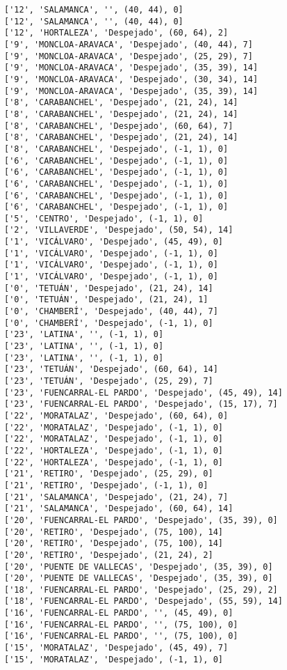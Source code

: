 \documentclass[11pt]{article}
\begin{document}
\begin{Verbatim}[commandchars=\\\{\}]
['12', 'SALAMANCA', '', (40, 44), 0]
['12', 'SALAMANCA', '', (40, 44), 0]
['12', 'HORTALEZA', 'Despejado', (60, 64), 2]
['9', 'MONCLOA-ARAVACA', 'Despejado', (40, 44), 7]
['9', 'MONCLOA-ARAVACA', 'Despejado', (25, 29), 7]
['9', 'MONCLOA-ARAVACA', 'Despejado', (35, 39), 14]
['9', 'MONCLOA-ARAVACA', 'Despejado', (30, 34), 14]
['9', 'MONCLOA-ARAVACA', 'Despejado', (35, 39), 14]
['8', 'CARABANCHEL', 'Despejado', (21, 24), 14]
['8', 'CARABANCHEL', 'Despejado', (21, 24), 14]
['8', 'CARABANCHEL', 'Despejado', (60, 64), 7]
['8', 'CARABANCHEL', 'Despejado', (21, 24), 14]
['8', 'CARABANCHEL', 'Despejado', (-1, 1), 0]
['6', 'CARABANCHEL', 'Despejado', (-1, 1), 0]
['6', 'CARABANCHEL', 'Despejado', (-1, 1), 0]
['6', 'CARABANCHEL', 'Despejado', (-1, 1), 0]
['6', 'CARABANCHEL', 'Despejado', (-1, 1), 0]
['6', 'CARABANCHEL', 'Despejado', (-1, 1), 0]
['5', 'CENTRO', 'Despejado', (-1, 1), 0]
['2', 'VILLAVERDE', 'Despejado', (50, 54), 14]
['1', 'VICÁLVARO', 'Despejado', (45, 49), 0]
['1', 'VICÁLVARO', 'Despejado', (-1, 1), 0]
['1', 'VICÁLVARO', 'Despejado', (-1, 1), 0]
['1', 'VICÁLVARO', 'Despejado', (-1, 1), 0]
['0', 'TETUÁN', 'Despejado', (21, 24), 14]
['0', 'TETUÁN', 'Despejado', (21, 24), 1]
['0', 'CHAMBERÍ', 'Despejado', (40, 44), 7]
['0', 'CHAMBERÍ', 'Despejado', (-1, 1), 0]
['23', 'LATINA', '', (-1, 1), 0]
['23', 'LATINA', '', (-1, 1), 0]
['23', 'LATINA', '', (-1, 1), 0]
['23', 'TETUÁN', 'Despejado', (60, 64), 14]
['23', 'TETUÁN', 'Despejado', (25, 29), 7]
['23', 'FUENCARRAL-EL PARDO', 'Despejado', (45, 49), 14]
['23', 'FUENCARRAL-EL PARDO', 'Despejado', (15, 17), 7]
['22', 'MORATALAZ', 'Despejado', (60, 64), 0]
['22', 'MORATALAZ', 'Despejado', (-1, 1), 0]
['22', 'MORATALAZ', 'Despejado', (-1, 1), 0]
['22', 'HORTALEZA', 'Despejado', (-1, 1), 0]
['22', 'HORTALEZA', 'Despejado', (-1, 1), 0]
['21', 'RETIRO', 'Despejado', (25, 29), 0]
['21', 'RETIRO', 'Despejado', (-1, 1), 0]
['21', 'SALAMANCA', 'Despejado', (21, 24), 7]
['21', 'SALAMANCA', 'Despejado', (60, 64), 14]
['20', 'FUENCARRAL-EL PARDO', 'Despejado', (35, 39), 0]
['20', 'RETIRO', 'Despejado', (75, 100), 14]
['20', 'RETIRO', 'Despejado', (75, 100), 14]
['20', 'RETIRO', 'Despejado', (21, 24), 2]
['20', 'PUENTE DE VALLECAS', 'Despejado', (35, 39), 0]
['20', 'PUENTE DE VALLECAS', 'Despejado', (35, 39), 0]
['18', 'FUENCARRAL-EL PARDO', 'Despejado', (25, 29), 2]
['18', 'FUENCARRAL-EL PARDO', 'Despejado', (55, 59), 14]
['16', 'FUENCARRAL-EL PARDO', '', (45, 49), 0]
['16', 'FUENCARRAL-EL PARDO', '', (75, 100), 0]
['16', 'FUENCARRAL-EL PARDO', '', (75, 100), 0]
['15', 'MORATALAZ', 'Despejado', (45, 49), 7]
['15', 'MORATALAZ', 'Despejado', (-1, 1), 0]

\end{Verbatim}
\end{document}
